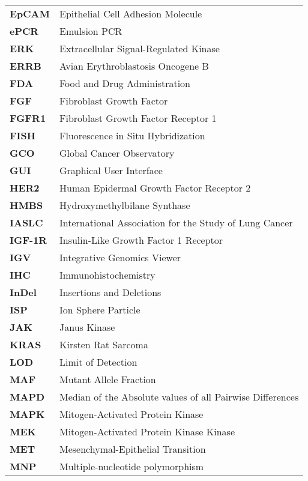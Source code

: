 \begin{longtable}[l]{l l}
    \textbf{EpCAM} & Epithelial Cell Adhesion Molecule \\
    \textbf{ePCR} & Emulsion PCR \\
    \textbf{ERK} & Extracellular Signal-Regulated Kinase \\
    \textbf{ERRB} & Avian Erythroblastosis Oncogene B \\
    \textbf{FDA} & Food and Drug Administration \\
    \textbf{FGF} & Fibroblast Growth Factor \\
    \textbf{FGFR1} & Fibroblast Growth Factor Receptor 1 \\
    \textbf{FISH} & Fluorescence in Situ Hybridization \\
    \textbf{GCO} & Global Cancer Observatory \\
    \textbf{GUI} & Graphical User Interface \\
    \textbf{HER2} & Human Epidermal Growth Factor Receptor 2 \\
    \textbf{HMBS} & Hydroxymethylbilane Synthase \\
    \textbf{IASLC} & International Association for the Study of Lung Cancer \\
    \textbf{IGF-1R} & Insulin-Like Growth Factor 1 Receptor \\
    \textbf{IGV} & Integrative Genomics Viewer \\
    \textbf{IHC} & Immunohistochemistry \\
    \textbf{InDel} & Insertions and Deletions \\
    \textbf{ISP} & Ion Sphere\texttrademark{} Particle \\
    \textbf{JAK} & Janus Kinase \\
    \textbf{KRAS} & Kirsten Rat Sarcoma \\
    \textbf{LOD} & Limit of Detection \\
    \textbf{MAF} & Mutant Allele Fraction \\
    \textbf{MAPD} & Median of the Absolute values of all Pairwise Differences \\
    \textbf{MAPK} & Mitogen-Activated Protein Kinase \\
    \textbf{MEK} & Mitogen-Activated Protein Kinase Kinase \\
    \textbf{MET} & Mesenchymal-Epithelial Transition \\
    \textbf{MNP} & Multiple-nucleotide polymorphism \\

\end{longtable}
